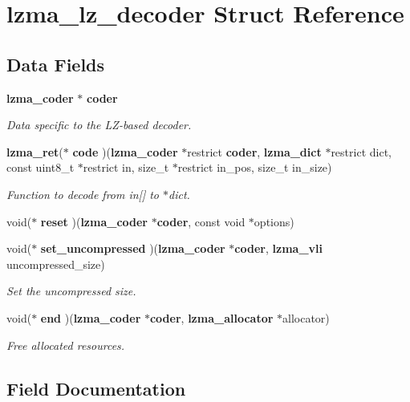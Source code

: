\section{lzma\-\_\-lz\-\_\-decoder Struct Reference}
\label{structlzma__lz__decoder}
\subsection*{Data Fields}
\begin{DoxyCompactItemize}
\item 
{\bf lzma\-\_\-coder} $\ast$ {\bf coder}
\begin{DoxyCompactList}\small\item\em Data specific to the L\-Z-\/based decoder. \end{DoxyCompactList}\item 
{\bf lzma\-\_\-ret}($\ast$ {\bf code} )({\bf lzma\-\_\-coder} $\ast$restrict {\bf coder}, {\bf lzma\-\_\-dict} $\ast$restrict dict, const uint8\-\_\-t $\ast$restrict in, size\-\_\-t $\ast$restrict in\-\_\-pos, size\-\_\-t in\-\_\-size)
\begin{DoxyCompactList}\small\item\em Function to decode from in[] to $\ast$dict. \end{DoxyCompactList}\item 
void($\ast$ {\bfseries reset} )({\bf lzma\-\_\-coder} $\ast${\bf coder}, const void $\ast$options)\label{structlzma__lz__decoder_ac6ed7432d839705cbdb56979c41564ec}

\item 
void($\ast$ {\bf set\-\_\-uncompressed} )({\bf lzma\-\_\-coder} $\ast${\bf coder}, {\bf lzma\-\_\-vli} uncompressed\-\_\-size)
\begin{DoxyCompactList}\small\item\em Set the uncompressed size. \end{DoxyCompactList}\item 
void($\ast$ {\bf end} )({\bf lzma\-\_\-coder} $\ast${\bf coder}, {\bf lzma\-\_\-allocator} $\ast$allocator)
\begin{DoxyCompactList}\small\item\em Free allocated resources. \end{DoxyCompactList}\end{DoxyCompactItemize}


\subsection{Field Documentation}
